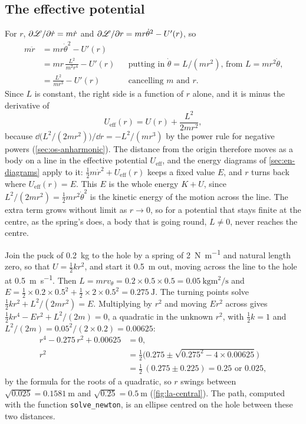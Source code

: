 \subsection*{The effective potential}

For $r$, $\partial\mathscr{L}/\partial\dot{r} = m\dot{r}$ and $\partial\mathscr{L}/
\partial r = mr\dot\theta^2 - U'(r)$, so
\begin{align*}
   m\ddot{r} &= mr\dot\theta^2 - U'(r)\\
   &= mr\,\frac{L^2}{m^2r^4} - U'(r)
   && \text{putting in $\dot\theta = L/(mr^2)$, from $L = mr^2\dot\theta$,}\\
   &= \frac{L^2}{mr^3} - U'(r)
   && \text{cancelling $m$ and $r$.}
\end{align*}
Since $L$ is constant, the right side is a function of $r$ alone, and it
is minus the derivative of
\begin{equation}
   U_{\mathrm{eff}}(r) = U(r) + \frac{L^2}{2mr^2} ,
   \label{eq:la-effective}
\end{equation}
because $\dd\bigl(L^2/(2mr^2)\bigr)/\dd r = -L^2/(mr^3)$ by the power rule for
negative powers (\cref{sec:os-anharmonic}). The distance from the origin
therefore moves as a body on a line in the effective potential
$U_{\mathrm{eff}}$, and the energy diagrams of \cref{sec:en-diagrams}
apply to it: $\frac12 m\dot{r}^2 + U_{\mathrm{eff}}(r)$ keeps a fixed
value $E$, and $r$ turns back where $U_{\mathrm{eff}}(r) = E$. This $E$ is
the whole energy $K + U$, since $L^2/(2mr^2) = \frac12 mr^2\dot\theta^2$
is the kinetic energy of the motion across the line. The extra term grows without limit as
$r \to 0$, so for a potential that stays finite at the centre, as the
spring's does, a body that is going round, $L \neq 0$, never reaches the
centre.

Join the puck of \SI{0.2}{\kilogram} to the hole by a spring of
\SI{2}{\newton\per\metre} and natural length zero, so that $U = \frac12
kr^2$, and start it \SI{0.5}{\metre} out, moving across the line to the
hole at \SI{0.5}{\metre\per\second}. Then $L = mrv_\theta = 0.2\times0.5\times0.5 =
\SI{0.05}{\kilogram\metre\squared\per\second}$ and $E = \frac12\times0.2
\times0.5^2 + \frac12\times2\times0.5^2 = \SI{0.275}{\joule}$. The turning
points solve $\frac12 kr^2 + L^2/(2mr^2) = E$. Multiplying by $r^2$ and
moving $Er^2$ across gives $\frac12 kr^4 - Er^2 + L^2/(2m) = 0$, a quadratic
in the unknown $r^2$, with $\frac12 k = 1$ and $L^2/(2m) =
0.05^2/(2\times0.2) = 0.00625$:
\begin{align*}
   r^4 - 0.275\,r^2 + 0.00625 &= 0 ,\\
   r^2 &= \tfrac12\bigl(0.275 \pm\sqrt{0.275^2 - 4\times0.00625}\bigr)\\
   &= \tfrac12\,(0.275 \pm 0.225) = 0.25 \text{ or } 0.025 ,
\end{align*}
by the formula for the roots of a quadratic,
so $r$ swings between $\sqrt{0.025} = \SI{0.1581}{\metre}$ and $\sqrt{0.25}
= \SI{0.5}{\metre}$
(\cref{fig:la-central}). The path, computed with the function
\texttt{solve\_newton}, is an ellipse centred on the hole between these
two distances.

